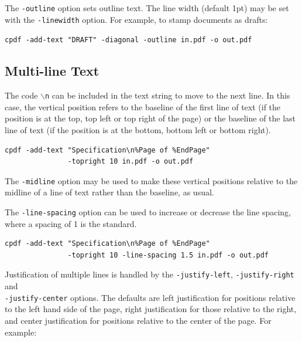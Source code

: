 \documentclass[a4paper,makeidx]{memoir}
\begin{document}
  The \texttt{-outline} option sets outline text. The line width (default 1pt)
  may be set with the \texttt{-linewidth} option. For example, to stamp
  documents as drafts:

  \begin{framed}
    \small\verb!cpdf -add-text "DRAFT" -diagonal -outline in.pdf -o out.pdf!
    
  \end{framed}

\subsection{Multi-line Text}

The code \texttt{$\backslash$n} can be included in the text string to move to
the next line. In this case, the vertical position refers to the baseline of
the first line of text (if the position is at the top, top left or top right of
the page) or the baseline of the last line of text (if the position is at the
bottom, bottom left or bottom right).

  \begin{framed}
    \small\begin{verbatim}cpdf -add-text "Specification\n%Page of %EndPage"
               -topright 10 in.pdf -o out.pdf\end{verbatim}
  \end{framed}

\noindent The \texttt{-midline} option may be used to make these vertical positions
relative to the midline of a line of text rather than the baseline, as usual.

The \texttt{-line-spacing} option can be used to increase or decrease the line
spacing, where a spacing of 1 is the standard.

  \begin{framed}
    \small\begin{verbatim}cpdf -add-text "Specification\n%Page of %EndPage"
               -topright 10 -line-spacing 1.5 in.pdf -o out.pdf\end{verbatim}
  \end{framed}

\noindent Justification of multiple lines is handled by the \texttt{-justify-left}, 
\texttt{-justify-right} and\\ \texttt{-justify-center} options. The defaults are
left justification for positions relative to the left hand side of the page,
right justification for those relative to the right, and center justification
for positions relative to the center of the page. For example:
\end{document}
